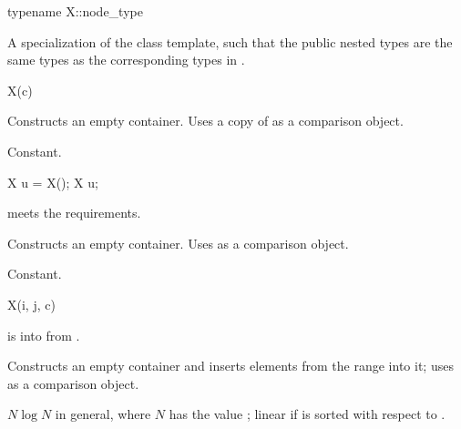 %
\begin{itemdecl}
typename X::node_type
\end{itemdecl}

\begin{itemdescr}
\pnum
\result
A specialization of
the  class template,
such that the public nested types are
the same types as the corresponding types in .
\end{itemdescr}

%
%
%
%
\begin{itemdecl}
X(c)
\end{itemdecl}

\begin{itemdescr}
\pnum
\effects
Constructs an empty container.
Uses a copy of  as a comparison object.

\pnum
\complexity
Constant.
\end{itemdescr}

%
%
%
%
\begin{itemdecl}
X u = X();
X u;
\end{itemdecl}

\begin{itemdescr}
\pnum
\expects
{} meets the  requirements.

\pnum
\effects
Constructs an empty container.
Uses  as a comparison object.

\pnum
\complexity
Constant.
\end{itemdescr}

%
%
%
%
\begin{itemdecl}
X(i, j, c)
\end{itemdecl}

\begin{itemdescr}
\pnum
\expects
{} is
 into  from .

\pnum
\effects
Constructs an empty container and
inserts elements from the range  into it;
uses  as a comparison object.

\pnum
\complexity
$N \log N$ in general, where $N$ has the value ;
linear if  is sorted with respect to .
\end{itemdescr}

